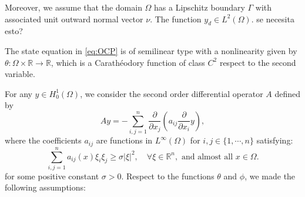 \documentclass[11pt,a4paper]{amsart}
\renewcommand{\l}{\left}
\renewcommand{\r}{\right}
\newcommand{\om}{\Omega}
\newcommand{\ga}{\Gamma}
\newcommand{\R}{\mathbb{R}}
\begin{document}
Moreover, we assume that the domain $\om$ has a Lipschitz boundary $\ga$ {\color{red}with associated unit outward normal vector $\nu$. The function $y_d\in L^2(\om)$. se necesita esto? }

The state equation in \eqref{eq:OCP} is of semilinear type with a nonlinearity given by  $\theta:\om\times \R\to \R$, which is a Carath\'eodory function of class $C^2$ respect to the second variable. %

For any $y\in H_0^1(\om)$, we consider the second order differential operator $A$ defined by
\[
    Ay=-\sum_{i,j=1}^{n}\dfrac{\partial}{\partial x_j}\l(a_{ij} \dfrac{\partial}{\partial x_i}y\r),
\]
where the coefficients $a_{ij}$ are functions in $ L^\infty(\om)$ for $i,j\in \{1,\cdots,n\}$ satisfying:
\begin{equation}\label{pdecondition}
    \sum_{i,j=1}^{n}a_{ij}(x)\xi_{i}\xi_{j} \ge \sigma  |\xi|^2, \quad \forall  \xi\in \R^n,\mbox{ and almost all }x\in \om.
\end{equation}
for some  positive constant $\sigma>0$. Respect to the functions $\theta$ and $\phi$, we made the following assumptions:
 
\end{document}
